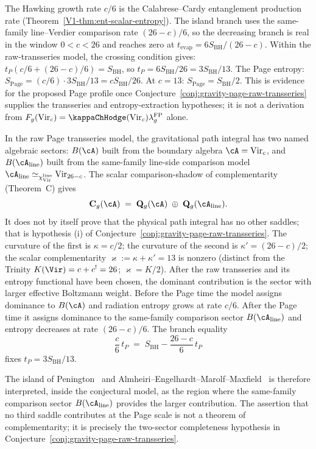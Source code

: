 \begin{remark}[Evidence]
The Hawking growth rate $c/6$ is the Calabrese--Cardy
entanglement production rate
(Theorem~\ref*{V1-thm:ent-scalar-entropy}).
The island branch uses the same-family line--Verdier comparison rate
$(26-c)/6$, so the decreasing branch is real in the window
$0<c<26$ and reaches zero at
$t_{\mathrm{evap}}=6S_{\mathrm{BH}}/(26-c)$.
Within the raw-transseries model, the crossing condition gives:
$t_P(c/6 + (26-c)/6) = S_{\mathrm{BH}}$, so
$t_P = 6S_{\mathrm{BH}}/26 = 3S_{\mathrm{BH}}/13$.
The Page entropy:
$S_{\mathrm{Page}} = (c/6)\cdot 3S_{\mathrm{BH}}/13
= cS_{\mathrm{BH}}/26$.
At $c = 13$: $S_{\mathrm{Page}} = S_{\mathrm{BH}}/2$.
This is evidence for the proposed Page profile once
Conjecture~\ref{conj:gravity-page-raw-transseries} supplies the
transseries and entropy-extraction hypotheses; it is not a derivation
from
$F_g(\mathrm{Vir}_c)=\kappaChHodge(\mathrm{Vir}_c)\lambda_g^{\mathrm{FP}}$
alone.
\end{remark}

\begin{remark}
\label{rem:gravity-island-koszul}
In the raw Page transseries model, the gravitational path integral
has two named algebraic sectors: $B(\cA)$ built from the boundary
algebra $\cA = \mathrm{Vir}_c$, and
$B(\cA_{\mathrm{line}})$ built from the same-family line-side
comparison model
\(\cA_{\mathrm{line}}\simeq_{\chi_{\mathrm{Vir}}^{\mathrm{line}}}
\mathrm{Vir}_{26-c}\).  The scalar comparison-shadow of
complementarity (Theorem~C) gives
\[
\mathbf{C}_g(\cA) \;=\; \mathbf{Q}_g(\cA) \;\oplus\;
\mathbf{Q}_g(\cA_{\mathrm{line}}).
\]
It does not by itself prove that the physical path integral has no
other saddles; that is hypothesis (i) of
Conjecture~\ref{conj:gravity-page-raw-transseries}.
The curvature of the first is
$\kappa = c/2$; the curvature of the second is
$\kappa' = (26-c)/2$; the scalar complementarity
$\varkappa := \kappa + \kappa' = 13$ is nonzero (distinct from
the Trinity $K(\Vir) = c + c^! = 26$; $\varkappa = K/2$).
After the raw transseries and its entropy functional have been
chosen, the dominant contribution is the sector with larger
effective Boltzmann weight. Before the Page time the model assigns
dominance to $B(\cA)$ and radiation entropy grows at rate $c/6$.
After the Page time it assigns dominance to the same-family
comparison sector $B(\cA_{\mathrm{line}})$ and entropy decreases at
rate $(26-c)/6$. The branch equality
\[
\frac{c}{6}\,t_P
\;=\;
S_{\mathrm{BH}}-\frac{26-c}{6}\,t_P
\]
fixes $t_P = 3S_{\mathrm{BH}}/13$.

The island of
Penington~\cite{Penington19} and
Almheiri--Engelhardt--Marolf--Maxfield~\cite{AEMM19}
is therefore interpreted, inside the conjectural model, as the region
where the same-family comparison sector
$B(\cA_{\mathrm{line}})$ provides the larger
contribution. The assertion that no third saddle contributes at the
Page scale is not a theorem of complementarity; it is precisely the
two-sector completeness hypothesis in
Conjecture~\ref{conj:gravity-page-raw-transseries}.
\end{remark}

